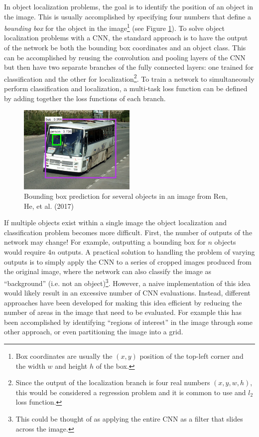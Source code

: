 In object localization problems, the goal is to identify the position of an object in the image. This is usually accomplished by specifying four numbers that define a \textit{bounding box} for the object in the image\footnote{Box coordinates are usually the $(x,y)$ position of the top-left corner and the width $w$ and height $h$ of the box.} (see Figure \ref{fig:boundingbox}). To solve object localization problems with a CNN, the standard approach is to have the output of the network be both the bounding box coordinates and an object class. This can be accomplished by reusing the convolution and pooling layers of the CNN but then have two separate branches of the fully connected layers: one trained for classification and the other for localization\footnote{Since the output of the localization branch is four real numbers $(x,y,w,h)$, this would be considered a regression problem and it is common to use and $l_2$ loss function.}. To train a network to simultaneously perform classification and localization, a multi-task loss function can be defined by adding together the loss functions of each branch.
\begin{figure}[ht] 
\begin{center}
\includegraphics[width=0.5\textwidth]{tex/figs/ch12_figs/boundingbox.png}
\caption{Bounding box prediction for several objects in an image from Ren, He, et al. (2017)\nocite{RenHeEtAl2017}}
\label{fig:boundingbox}
\end{center}
\end{figure}

If multiple objects exist within a single image the object localization and classification problem becomes more difficult. First, the number of outputs of the network may change! For example, outputting a bounding box for $n$ objects would require $4n$ outputs. A practical solution to handling the problem of varying outputs is to simply apply the CNN to a series of cropped images produced from the original image, where the network can also classify the image as ``background'' (i.e. not an object)\footnote{This could be thought of as applying the entire CNN as a filter that slides across the image.}. 
However, a naive implementation of this idea would likely result in an excessive number of CNN evaluations. Instead, different approaches have been developed for making this idea efficient by reducing the number of areas in the image that need to be evaluated. For example this has been accomplished by identifying ``regions of interest'' in the image through some other approach, or even partitioning the image into a grid.
